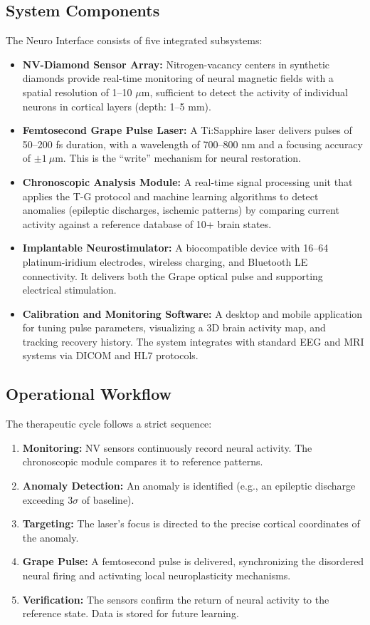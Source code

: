 \documentclass[12pt]{article}
\begin{document}
\subsection{System Components}
The Neuro Interface consists of five integrated subsystems:
\begin{itemize}
    \item \textbf{NV-Diamond Sensor Array:} Nitrogen-vacancy centers in synthetic diamonds provide real-time monitoring of neural magnetic fields with a spatial resolution of 1--10 $\mu$m, sufficient to detect the activity of individual neurons in cortical layers (depth: 1--5 mm).
    \item \textbf{Femtosecond Grape Pulse Laser:} A Ti:Sapphire laser delivers pulses of 50--200 fs duration, with a wavelength of 700--800 nm and a focusing accuracy of $\pm 1~\mu$m. This is the ``write'' mechanism for neural restoration.
    \item \textbf{Chronoscopic Analysis Module:} A real-time signal processing unit that applies the T-G protocol and machine learning algorithms to detect anomalies (epileptic discharges, ischemic patterns) by comparing current activity against a reference database of 10+ brain states.
    \item \textbf{Implantable Neurostimulator:} A biocompatible device with 16--64 platinum-iridium electrodes, wireless charging, and Bluetooth LE connectivity. It delivers both the Grape optical pulse and supporting electrical stimulation.
    \item \textbf{Calibration and Monitoring Software:} A desktop and mobile application for tuning pulse parameters, visualizing a 3D brain activity map, and tracking recovery history. The system integrates with standard EEG and MRI systems via DICOM and HL7 protocols.
\end{itemize}

\subsection{Operational Workflow}
The therapeutic cycle follows a strict sequence:
\begin{enumerate}
    \item \textbf{Monitoring:} NV sensors continuously record neural activity. The chronoscopic module compares it to reference patterns.
    \item \textbf{Anomaly Detection:} An anomaly is identified (e.g., an epileptic discharge exceeding 3$\sigma$ of baseline).
    \item \textbf{Targeting:} The laser's focus is directed to the precise cortical coordinates of the anomaly.
    \item \textbf{Grape Pulse:} A femtosecond pulse is delivered, synchronizing the disordered neural firing and activating local neuroplasticity mechanisms.
    \item \textbf{Verification:} The sensors confirm the return of neural activity to the reference state. Data is stored for future learning.
\end{enumerate}
\end{document}
